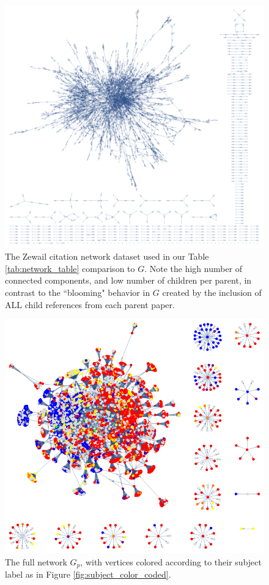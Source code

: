 \documentclass[12pt]{thesis}
\theoremstyle{plain}
\theoremstyle{definition}
\theoremstyle{remark}
\begin{document}
\begin{figure}[H]
\centering
\includegraphics[width=\textwidth]{display_zewail.png}
\caption{The Zewail citation network dataset used in our Table \ref{tab:network_table} comparison to $G$. Note the high number of connected components, and low number of children per parent, in contrast to the ``blooming" behavior in $G$ created by the inclusion of ALL child references from each parent paper.}
\label{fig:zewail}
\end{figure}

\begin{figure}[H]
\centering
\includegraphics[width=\textwidth]{full_network_color_coded.png}
\caption{The full network $G_p$, with vertices colored according to their subject label as in Figure \ref{fig:subject_color_coded}.}
\label{fig:full_subject_color_coded}
\end{figure}
\end{document}
